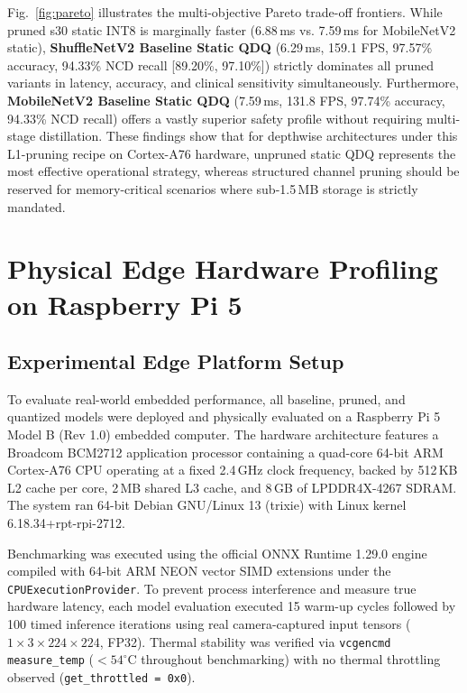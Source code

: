 \documentclass{jcse}
\begin{document}
Fig.~\ref{fig:pareto} illustrates the multi-objective Pareto trade-off frontiers. While pruned s30 static INT8 is marginally faster (6.88\,ms vs. 7.59\,ms for MobileNetV2 static), \textbf{ShuffleNetV2 Baseline Static QDQ} (6.29\,ms, 159.1 FPS, 97.57\% accuracy, 94.33\% NCD recall [89.20\%, 97.10\%]) strictly dominates all pruned variants in latency, accuracy, and clinical sensitivity simultaneously. Furthermore, \textbf{MobileNetV2 Baseline Static QDQ} (7.59\,ms, 131.8 FPS, 97.74\% accuracy, 94.33\% NCD recall) offers a vastly superior safety profile without requiring multi-stage distillation. These findings show that for depthwise architectures under this L1-pruning recipe on Cortex-A76 hardware, unpruned static QDQ represents the most effective operational strategy, whereas structured channel pruning should be reserved for memory-critical scenarios where sub-1.5\,MB storage is strictly mandated.

\section{Physical Edge Hardware Profiling on Raspberry Pi 5}

\subsection{Experimental Edge Platform Setup}
To evaluate real-world embedded performance, all baseline, pruned, and quantized models were deployed and physically evaluated on a Raspberry Pi 5 Model B (Rev 1.0) embedded computer. The hardware architecture features a Broadcom BCM2712 application processor containing a quad-core 64-bit ARM Cortex-A76 CPU operating at a fixed 2.4\,GHz clock frequency, backed by 512\,KB L2 cache per core, 2\,MB shared L3 cache, and 8\,GB of LPDDR4X-4267 SDRAM. The system ran 64-bit Debian GNU/Linux 13 (trixie) with Linux kernel 6.18.34+rpt-rpi-2712.

Benchmarking was executed using the official ONNX Runtime 1.29.0 engine compiled with 64-bit ARM NEON vector SIMD extensions under the \texttt{CPUExecutionProvider}. To prevent process interference and measure true hardware latency, each model evaluation executed 15 warm-up cycles followed by 100 timed inference iterations using real camera-captured input tensors ($1 \times 3 \times 224 \times 224$, FP32). Thermal stability was verified via \texttt{vcgencmd measure\_temp} ($< 54^\circ$C throughout benchmarking) with no thermal throttling observed (\texttt{get\_throttled = 0x0}).
\end{document}
